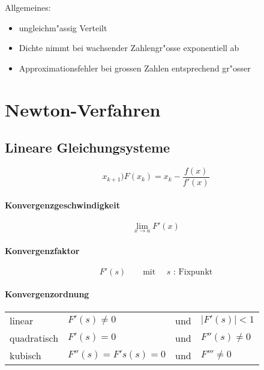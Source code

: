 \noindent Allgemeines:
\begin{itemize}
	\item ungleichm"assig Verteilt
	\item Dichte nimmt bei wachsender Zahlengr"osse exponentiell ab
	\item Approximationsfehler bei grossen Zahlen entsprechend gr"osser
\end{itemize}

\section{Newton-Verfahren}

\subsection{Lineare Gleichungsysteme}
\begin{equation}
	x_{k+1})F(x_k)=x_k-\frac{f(x)}{f'(x)}
\end{equation}

\paragraph{Konvergenzgeschwindigkeit}
\begin{equation}
	\lim_{x\rightarrow a}F'(x)
\end{equation}

\paragraph{Konvergenzfaktor}
\begin{equation}
	F'(s)\qquad\text{mit }\quad s\text{ : Fixpunkt}
\end{equation}

\paragraph{Konvergenzordnung}
\begin{center}\begin{tabular}{l l l l}
	linear			& $F'(s)\neq 0$ 	& und	& $|F'(s)|<1$ \\
	quadratisch		& $F'(s)=0$			& und	& $F''(s)\neq 0$ \\
	kubisch			& $F''(s)=F's(s)=0$	& und	& $F'''\neq 0$
\end{tabular}\end{center}

